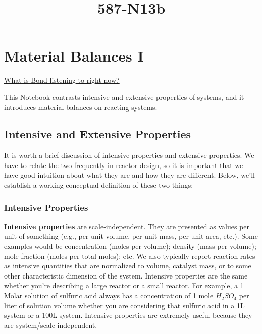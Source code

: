 \documentclass[11pt]{article}
\title{587-N13b}
\begin{document}
    
    \maketitle
    
    

    
    \hypertarget{material-balances-i}{%
\section{Material Balances I}\label{material-balances-i}}

\href{https://www.youtube.com/watch?v=7eXTF6paB6Q\&list=RD7eXTF6paB6Q\&start_radio=1}{What
is Bond listening to right now?}

This Notebook contrasts intensive and extensive properties of systems,
and it introduces material balances on reacting systems.

    \hypertarget{intensive-and-extensive-properties}{%
\subsection{Intensive and Extensive
Properties}\label{intensive-and-extensive-properties}}

It is worth a brief discussion of intensive properties and extensive
properties. We have to relate the two frequently in reactor design, so
it is important that we have good intuition about what they are and how
they are different. Below, we'll establish a working conceptual
definition of these two things:

\hypertarget{intensive-properties}{%
\subsubsection{Intensive Properties}\label{intensive-properties}}

\textbf{Intensive properties} are scale-independent. They are presented
as values per unit of something (e.g., per unit volume, per unit mass,
per unit area, etc.). Some examples would be concentration (moles per
volume); density (mass per volume); mole fraction (moles per total
moles); etc. We also typically report reaction rates as intensive
quantities that are normalized to volume, catalyst mass, or to some
other characteristic dimension of the system. Intensive properties are
the same whether you're describing a large reactor or a small reactor.
For example, a 1 Molar solution of sulfuric acid always has a
concentration of 1 mole \(H_2SO_4\) per liter of solution volume whether
you are considering that sulfuric acid in a 1L system or a 100L system.
Intensive properties are extremely useful because they are system/scale
independent.
\end{document}
